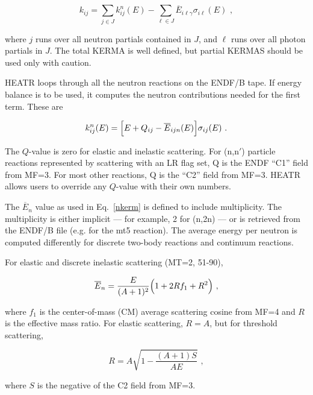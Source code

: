 \begin{equation}
   k_{ij}=\sum_{j\in J}k_{ij}^n(E)-\sum_{\ell\in J}
    \overline{E}_{i\ell\gamma}\sigma_{i\ell}(E)\,\,,
\label{reordered}
\end{equation}
\vspace{0.5 pt}

\noindent
where $j$ runs over all neutron partials contained in $J$, and
$\ell$ runs over all photon partials in $J$.  The total KERMA is
well defined, but partial KERMAS should be used only with caution.

HEATR loops through all the neutron reactions on the ENDF/B tape.
If energy balance is to be used, it computes the neutron
contributions needed for the first term.  These are

\begin{equation}
   k_{ij}^n(E)=
    \Bigl[E+Q_{ij}-\overline{E}_{ijn}(E)\Bigr]\sigma_{ij}(E)\,\,.
\label{nkerm}
\end{equation}
\vspace{0.5 pt}

The $Q$-value is zero for elastic and inelastic scattering.  For
(n,n$'$) particle reactions represented by scattering with an
LR flag set, Q is the ENDF ``C1'' field from MF=3.  For most
other reactions, Q is the ``C2'' field from MF=3.  HEATR allows
users to override any $Q$-value with their own numbers.

The $\overline{E}_n$ value as used in Eq.~\ref{nkerm} is
defined to include multiplicity.  The multiplicity is either
implicit --- for example, 2 for (n,2n) --- or is retrieved from the
ENDF/B file (e.g. for the mt5 reaction).  The average energy per
neutron is computed differently for discrete two-body reactions
and continuum reactions.

For elastic and discrete inelastic scattering (MT=2, 51-90),

\begin{equation}
   \overline{E}_n=\frac{E}{(A+1)^2}\Bigl(1+2Rf_1+R^2\Bigr)\,\,,
\label{enb}
\end{equation}

\noindent
where $f_1$ is the center-of-mass (CM) average scattering cosine
from MF=4 and $R$ is the effective mass ratio.  For elastic
scattering, $R{=}A$, but for threshold scattering,

\begin{equation}
   R=A\sqrt{1-\frac{(A+1)S}{AE}}\,\,,
\end{equation}

\noindent
where $S$ is the negative of the C2 field from MF=3.

